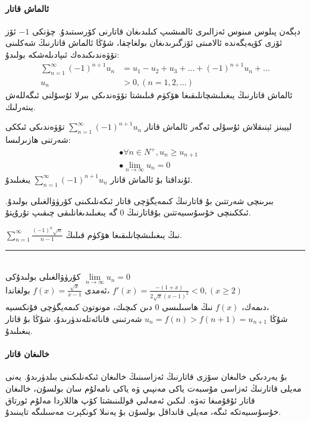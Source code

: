 \paragraph{ئالماش قاتار}
دېگەن پىلوس مىنوس ئەزالىرى ئالمىشىپ كىلىدىغان قاتارنى كۆرسىتىدۇ. چۈنكى 
$-1$
ئۆز ئۆزى كۆپەيگەندە ئالامىتى ئۆزگىرىدىغان بولغاچقا، شۇڭا ئالماش قاتارنىڭ شەكلىنى تۆۋەندىكىدەك ئىپادىلەشكە بولىدۇ:
\begin{align*}
\sum\limits_{n=1}^\infty (-1)^{n+1} u_n &= u_1-u_2+u_3+...+(-1)^{n+1}u_n+...\\
u_n &> 0, (n =1,2,...)
\end{align*}
ئالماش قاتارنىڭ يىغىلىشچانلىقىغا ھۆكۈم قىلىشتا تۆۋەندىكى بىرلا ئۇسۇلنى ئىگەللەش يىتەرلىك.
\begin{MyTheorem}{لېيبنز ئېنىقلاش ئۇسۇلى}{}%
	ئەگەر ئالماش قاتار
$\sum\limits_{n=1}^\infty (-1)^{n+1} u_n$
تۆۋەندىكى ئىككى شەرتنى ھازىرلىسا:
	\begin{align*}
		&\bullet \forall n \in N^{+}, u_{n} \ge u_{n+1} \\
		&\bullet \lim\limits_{n\to\infty} u_n = 0
	\end{align*}
ئۇنداقتا بۇ ئالماش قاتار $\sum\limits_{n=1}^\infty (-1)^{n+1} u_n$ يىغىلىدۇ.
\end{MyTheorem}

بىرىنچى شەرتتىن بۇ قاتارنىڭ كىمەيگۈچى قاتار ئىكەنلىكىنى كۆرۈۋالغىلى بولىدۇ. ئىككىنچى خۇسۇسىيەتتىن بۇقاتارنىڭ $0$ گە يىغىلىدىغانلىقى چىقىپ تۇرۇپتۇ.
\begin{myexample}
			$\sum\limits_{n=1}^{\infty} \frac{(-1)^n\sqrt{n}}{n-1}$
نىڭ يىغىلىشچانلىقىغا ھۆكۈم قىلىڭ.
\\\rule{\linewidth}{0.05em}\\
 كۆرۈۋالغىلى بولىدۇكى 
			$\lim\limits_{n\to\infty} u_n = 0$\\
ئەمدى 
			$f(x)=\frac{\sqrt{x}}{x-1}$
			بولغاندا،
			$f'(x)=\frac{-(1+x)}{2\sqrt{x}(x-1)^2}<0,(x \ge 2)$\\
			دىمەك، 
			$f(x)$
			نىڭ ھاسىلىسى $0$ دىن كىچىك، مونوتون كىمەيگۈچى فۇنكسىيە،\\شۇڭا 
			$u_{n} = f(n) > f(n+1) =  u_{n+1}$
			شەرتىنى قانائەتلەندۈرىدۇ، شۇڭا بۇ قاتار يىغىلىدۇ.
\end{myexample}

\paragraph{خالىغان قاتار}
بۇ يەردىكى خالىغان سۆزى قاتارنىڭ ئەزاسىنىڭ خالىغان ئىكەنلىكىنى بىلدۈرىدۇ. يەنى مەيلى قاتارنىڭ ئەزاسى مۇسبەت ياكى مەنپىي ۋە ياكى نامەلۇم سان بولسۇن، خالىغان قاتار  ئۇقۇمىغا تەۋە. لىكىن ئەمەلىي قوللىنىشتا كۆپ ھاللاردا مەلۇم ئورتاق خۇسۇسىيەتكە ئىگە، مەيلى قانداقل بولسۇن بۇ يەنىلا كونكېرت مەسىلىگە تايىنىدۇ.

